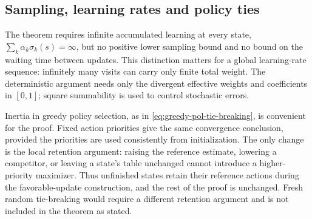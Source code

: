 


\subsection{Sampling, learning rates and policy ties}
\label{sec: relaxing conditions}
The theorem requires infinite accumulated learning at every state, $\sum_k\alpha_k\sigma_k(s)=\infty$, but no positive lower sampling bound and no bound on the waiting time between updates. This distinction matters for a global learning-rate sequence: infinitely many visits can carry only finite total weight. The deterministic argument needs only the divergent effective weights and coefficients in $[0,1]$; square summability is used to control stochastic errors.

Inertia in greedy policy selection, as in \eqref{eq:greedy-pol-tie-breaking}, is convenient for the proof. Fixed action priorities give the same convergence conclusion, provided the priorities are used consistently from initialization. The only change is the local retention argument: raising the reference estimate, lowering a competitor, or leaving a state's table unchanged cannot introduce a higher-priority maximizer. Thus unfinished states retain their reference actions during the favorable-update construction, and the rest of the proof is unchanged. Fresh random tie-breaking would require a different retention argument and is not included in the theorem as stated.

